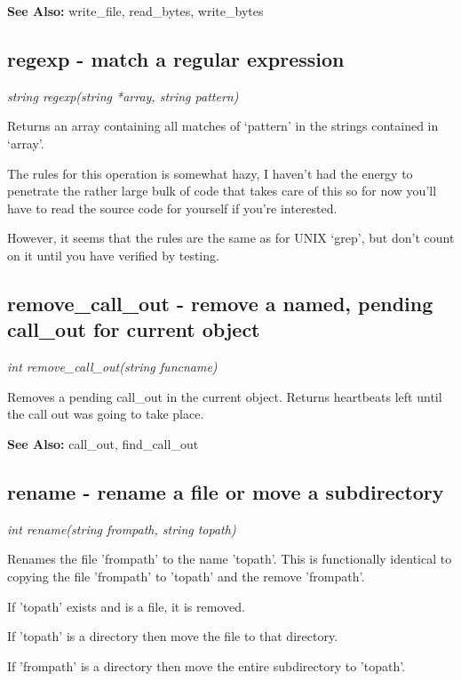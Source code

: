     {\bf See Also: }    write\_file, read\_bytes, write\_bytes



\subsection{regexp - match a regular expression}

    {\em string regexp(string *array, string pattern)}

    Returns an array containing all matches of `pattern' in the
    strings contained in `array'.

    The rules for this operation is somewhat hazy, I haven't had
    the energy to penetrate the rather large bulk of code that
    takes care of this so for now you'll have to read the source
    code for yourself if you're interested.

    However, it seems that the rules are the same as for UNIX
    `grep', but don't count on it until you have verified by
    testing.



\subsection{remove\_call\_out - remove a named, pending call\_out for current object}

    {\em int remove\_call\_out(string funcname)}

    Removes a pending call\_out in the current object. Returns heartbeats
    left until the call out was going to take place.

    {\bf See Also: }    call\_out, find\_call\_out


\subsection{rename - rename a file or move a subdirectory}

    {\em int rename(string frompath, string topath)}

    Renames the file 'frompath' to the name 'topath'. This is functionally
    identical to copying the file 'frompath' to 'topath' and the remove
    'frompath'. 
    
    If 'topath' exists and is a file, it is removed.

    If 'topath' is a directory then move the file to that directory.

    If 'frompath' is a directory then move the entire subdirectory
    to 'topath'.

